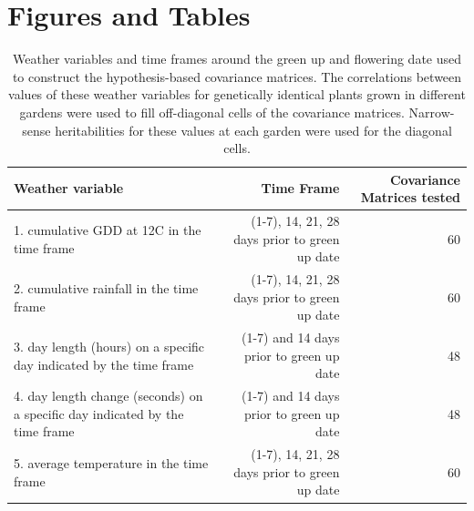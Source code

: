 \documentclass[
  9pt,
  twocolumn,
  twoside]{pnas-new}
\begin{document}
\section{Figures and Tables}\label{figures-and-tables}

\begin{table}[t!]
\centering
\caption{Weather variables and time frames around the green up and flowering date used to construct the hypothesis-based covariance matrices. The correlations between values of these weather variables for genetically identical plants grown in different gardens were used to fill off-diagonal cells of the covariance matrices. Narrow-sense heritabilities for these values at each garden were used for the diagonal cells.}
\begin{tabular}{lrr}
Weather variable & Time Frame & Covariance Matrices tested \\
\midrule
1. cumulative GDD at 12C in the time frame & (1-7), 14, 21, 28 days prior to green up date & 60 \\
2. cumulative rainfall in the time frame & (1-7), 14, 21, 28 days prior to green up date & 60  \\
3. day length (hours) on a specific day indicated by the time frame & (1-7) and 14 days prior to green up date & 48 \\
4. day length change (seconds) on a specific day indicated by the time frame & (1-7) and 14 days prior to green up date & 48 \\
5. average temperature in the time frame & (1-7), 14, 21, 28 days prior to green up date & 60 \\
\bottomrule
\end{tabular}

\end{table}
\end{document}
